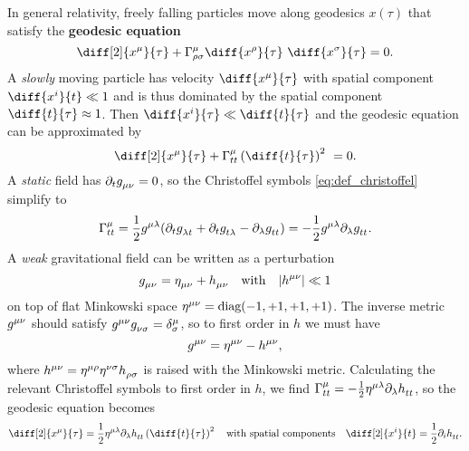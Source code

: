 In general relativity, freely falling particles move along geodesics $x(\tau)$ that satisfy the \textbf{geodesic equation}
\begin{equation}
	\diff[2]{x^\mu}{\tau} + \Gamma^\mu_{\rho \sigma} \diff{x^\rho}{\tau} \diff{x^\sigma}{\tau} = 0 .
	\label{eq:geodesic}
\end{equation}
A \emph{slowly} moving particle has velocity $\diff{x^\mu}{\tau}$ with spatial component $\diff{x^i}{t} \ll 1$ and is thus dominated by the spatial component $\diff{t}{\tau} \approx 1$. Then $\diff{x^i}{\tau} \ll \diff{t}{\tau}$ and the geodesic equation can be approximated by
\begin{equation*}
	\diff[2]{x^\mu}{\tau} + \Gamma^\mu_{tt} \left( \diff{t}{\tau} \right)^2 = 0 .
\end{equation*}
A \emph{static} field has $\partial_t g\indices{_\mu_\nu} = 0$, so the Christoffel symbols \eqref{eq:def_christoffel} simplify to
\begin{equation*}
	\Gamma^\mu_{tt} = \frac{1}{2} g\indices{^\mu^\lambda} (\partial_t g\indices{_\lambda_t} + \partial_t g\indices{_t_\lambda} - \partial_\lambda g\indices{_t_t}) = -\frac{1}{2} g\indices{^\mu^\lambda} \partial_\lambda g\indices{_t_t} .
\end{equation*}
A \emph{weak} gravitational field can be written as a perturbation 
\begin{equation}
	g\indices{_\mu_\nu} = \eta\indices{_\mu_\nu} + h\indices{_\mu_\nu}
	\quad \text{with} \quad
	\abs{h\indices{^\mu^\nu}} \ll 1
	\label{eq:weak_field_limit:metric_perturbation}
\end{equation}
on top of flat Minkowski space $\eta\indices{^\mu^\nu} = \text{diag}(-1, +1, +1, +1)$.
The inverse metric $g\indices{^\mu^\nu}$ should satisfy $g\indices{^\mu^\nu} g\indices{_\nu_\sigma} = \delta^\mu_\sigma$, so to first order in $h$ we must have
\begin{equation*}
	g\indices{^\mu^\nu} = \eta\indices{^\mu^\nu} - h\indices{^\mu^\nu} ,
\end{equation*}
where $h\indices{^\mu^\nu} = \eta\indices{^\mu^\rho} \eta\indices{^\nu^\sigma} h\indices{_\rho_\sigma}$ is raised with the Minkowski metric.
Calculating the relevant Christoffel symbols to first order in $h$, we find $\Gamma^\mu_{tt} = -\frac{1}{2} \eta\indices{^\mu^\lambda} \partial_\lambda h\indices{_t_t}$, so the geodesic equation becomes
\begin{equation*}
	\diff[2]{x^\mu}{\tau} = \frac{1}{2} \eta\indices{^\mu^\lambda} \partial_\lambda h\indices{_t_t} \left( \diff{t}{\tau} \right)^2
	\quad \text{with spatial components} \quad
	\diff[2]{x^i}{t} = \frac{1}{2} \partial_i h\indices{_t_t} .
\end{equation*}
